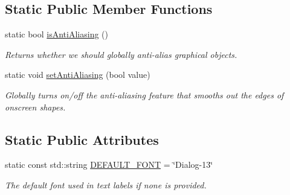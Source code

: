 \subsection*{Static Public Member Functions}
\begin{DoxyCompactItemize}
\item 
static bool \mbox{\hyperlink{classGObject_a93be0e1fe1b1bf1a1da732470c94f42b}{is\+Anti\+Aliasing}} ()
\begin{DoxyCompactList}\small\item\em Returns whether we should globally anti-\/alias graphical objects. \end{DoxyCompactList}\item 
static void \mbox{\hyperlink{classGObject_a1e43371668ae850193cebedb44e1bbe3}{set\+Anti\+Aliasing}} (bool value)
\begin{DoxyCompactList}\small\item\em Globally turns on/off the anti-\/aliasing feature that smooths out the edges of onscreen shapes. \end{DoxyCompactList}\end{DoxyCompactItemize}
\subsection*{Static Public Attributes}
\begin{DoxyCompactItemize}
\item 
static const std\+::string \mbox{\hyperlink{classGText_ab265ee508af32c0c0bb1aa3693977247}{D\+E\+F\+A\+U\+L\+T\+\_\+\+F\+O\+NT}} = \char`\"{}Dialog-\/13\char`\"{}
\begin{DoxyCompactList}\small\item\em The default font used in text labels if none is provided. \end{DoxyCompactList}\end{DoxyCompactItemize}
